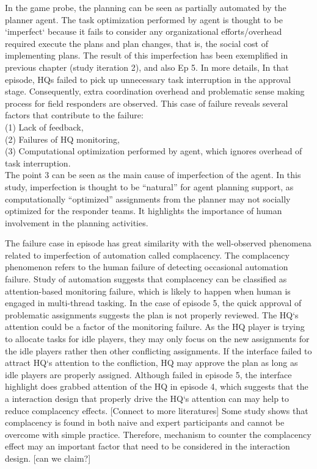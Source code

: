 In the game probe, the planning can be seen as partially automated by the planner agent. The task optimization performed by agent is thought to be `imperfect` because it fails to consider any organizational efforts/overhead required execute the plans and plan changes, that is, the social cost of implementing plans. The result of this imperfection has been exemplified in previous chapter (study iteration 2), and also Ep 5. In more details, In that episode, HQs failed to pick up unnecessary task interruption in the approval stage. Consequently, extra coordination overhead and problematic sense making process for field responders are observed. This case of failure reveals several factors that contribute to the failure: \\

(1) Lack of feedback, \\
(2) Failures of HQ monitoring, \\
(3) Computational optimization performed by agent, which ignores overhead of task interruption. \\

The point 3 can be seen as the main cause of imperfection of the agent. In this study, imperfection is thought to be ``natural'' for agent planning support, as computationally ``optimized'' assignments from the planner may not socially optimized for the responder teams. It highlights the importance of human involvement in the planning activities. 

The failure case in episode has great similarity with the well-observed phenomena related to imperfection of automation called complacency. The complacency phenomenon refers to the human failure of detecting occasional automation failure. Study of automation suggests that complacency can be classified as attention-based monitoring failure, which is likely to happen when human is engaged in multi-thread tasking. In the case of episode 5, the quick approval of problematic assignments suggests the plan is not properly reviewed. The HQ`s attention could be a factor of the monitoring failure. As the HQ player is trying to allocate tasks for idle players, they may only focus on the new assignments for the idle players rather then other conflicting assignments.  If the interface failed to attract HQ`s attention to the confliction, HQ may approve the plan as long as idle players are properly assigned. Although failed in episode 5, the interface highlight does grabbed attention of the HQ in episode 4, which suggests that the a interaction design that properly drive the HQ`s attention can may help to reduce complacency effects.  [Connect to more literatures] Some study shows that complacency is found in both naive and expert participants and cannot be overcome with simple practice. Therefore, mechanism to counter the complacency effect may an important factor that need to be considered in the interaction design. [can we claim?]

